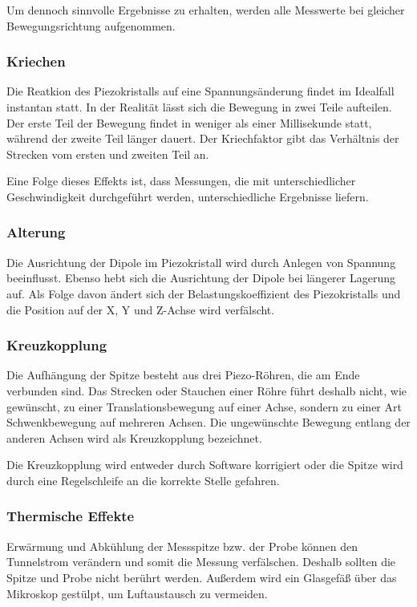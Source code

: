 Um dennoch sinnvolle Ergebnisse zu erhalten, werden alle Messwerte bei gleicher Bewegungsrichtung aufgenommen.

\subsubsection{Kriechen}
Die Reatkion des Piezokristalls auf eine Spannungsänderung findet im Idealfall instantan statt.
In der Realität lässt sich die Bewegung in zwei Teile aufteilen.
Der erste Teil der Bewegung findet in weniger als einer Millisekunde statt, während der zweite Teil länger dauert.
Der Kriechfaktor gibt das Verhältnis der Strecken vom ersten und zweiten Teil an.

Eine Folge dieses Effekts ist, dass Messungen, die mit unterschiedlicher Geschwindigkeit durchgeführt werden, unterschiedliche Ergebnisse liefern.

\subsubsection{Alterung}
Die Ausrichtung der Dipole im Piezokristall wird durch Anlegen von Spannung beeinflusst.
Ebenso hebt sich die Ausrichtung der Dipole bei längerer Lagerung auf.
Als Folge davon ändert sich der Belastungskoeffizient des Piezokristalls und die Position auf der X, Y und Z-Achse wird verfälscht.

\subsubsection{Kreuzkopplung}

Die Aufhängung der Spitze besteht aus drei Piezo-Röhren, die am Ende verbunden sind.
Das Strecken oder Stauchen einer Röhre führt deshalb nicht, wie gewünscht, zu einer Translationsbewegung auf einer Achse, sondern zu einer Art Schwenkbewegung auf mehreren Achsen.
Die ungewünschte Bewegung entlang der anderen Achsen wird als Kreuzkopplung bezeichnet.

Die Kreuzkopplung wird entweder durch Software korrigiert oder die Spitze wird durch eine Regelschleife an die korrekte Stelle gefahren.

\subsubsection{Thermische Effekte}
Erwärmung und Abkühlung der Messspitze bzw. der Probe können den Tunnelstrom verändern und somit die Messung verfälschen.
Deshalb sollten die Spitze und Probe nicht berührt werden.
Außerdem wird ein Glasgefäß über das Mikroskop gestülpt, um Luftaustausch zu vermeiden.

